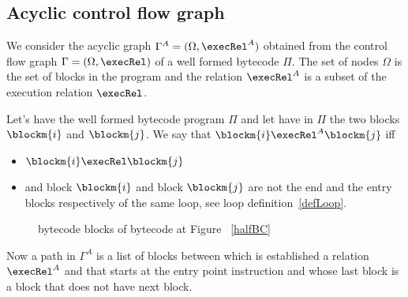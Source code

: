 \subsection{Acyclic control flow graph} \label{graph}
We consider the acyclic graph $\Gamma^A = ( \Omega, \execRel^A)$ obtained from the control flow graph 
$\Gamma  = ( \Omega, \execRel)$ of a well formed bytecode $ \Pi $. The set of nodes $\Omega$ is the set of  blocks in the 
program and the relation  $\execRel^A$ is a subset of the  execution relation $\execRel$.
\begin{defn}
\label{acyclicExRel}
Let's have the well formed bytecode program $\Pi$ and let have in $\Pi$ the two blocks  $\blockm{i} $ and   $\blockm{j}$. We say 
that $\blockm{i} \execRel^A \blockm{j}$ iff
\begin{itemize}
\item $\blockm{i} \execRel \blockm{j}$
\item and block $\blockm{i}$ and block $\blockm{j}$ are not the end and the entry blocks respectively of the same loop, see loop definition~\ref{defLoop}.
\end{itemize}
\end{defn}


\begin{figure}[p]
\begin{center}
\end{center}
\caption{bytecode blocks of bytecode at Figure ~\ref{halfBC}}
\label{blockBC}
\end{figure}

Now a path in $\Gamma^A$  is a list of blocks between which is established a relation $\execRel^A$ and that starts at the entry point instruction and whose last block is a block that does not have next block.

